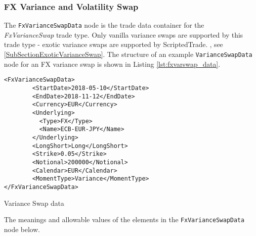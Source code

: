 \subsubsection{FX Variance and Volatility Swap}
\label{SubSectionFxVarianceSwap}

The \lstinline!FxVarianceSwapData! node is the trade data container for the \emph{FxVarianceSwap} trade type. Only vanilla variance swaps are supported by this trade type - exotic variance swaps are supported by ScriptedTrade\ifdefined\OrePlusDoc. \else, see  \ref{SubSectionExoticVarianceSwap}. \fi
The structure of an example \lstinline!VarianceSwapData! node for an FX variance swap is shown in Listing \ref{lst:fxvarswap_data}.

\begin{listing}[H]
	\begin{verbatim}
<FxVarianceSwapData>
        <StartDate>2018-05-10</StartDate>
        <EndDate>2018-11-12</EndDate>
        <Currency>EUR</Currency>
        <Underlying>
          <Type>FX</Type>
          <Name>ECB-EUR-JPY</Name>
        </Underlying>
        <LongShort>Long</LongShort>
        <Strike>0.05</Strike>
        <Notional>200000</Notional>
        <Calendar>EUR</Calendar>
        <MomentType>Variance</MomentType>
</FxVarianceSwapData>
	\end{verbatim}
	\caption{Variance Swap data}
	\label{lst:fxvarswap_data}
\end{listing}

The meanings and allowable values of the elements in the \lstinline!FxVarianceSwapData! node below.

